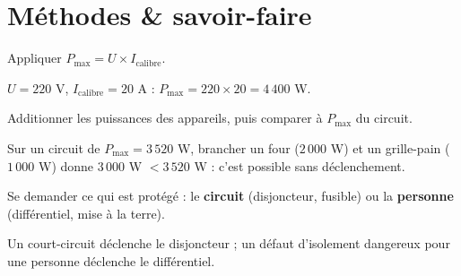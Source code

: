 \section{Méthodes \& savoir-faire}

Appliquer $P_{\max}=U\times I_{\text{calibre}}$.
\begin{exemple}
$U=220$ V, $I_{\text{calibre}}=20$ A : $P_{\max}=220\times20=4\,400$ W.
\end{exemple}

Additionner les puissances des appareils, puis comparer à $P_{\max}$ du circuit.
\begin{exemple}
Sur un circuit de $P_{\max}=3\,520$ W, brancher un four ($2\,000$ W) et un grille-pain
($1\,000$ W) donne $3\,000$ W $<3\,520$ W : c'est possible sans déclenchement.
\end{exemple}

Se demander ce qui est protégé : le \textbf{circuit} (disjoncteur, fusible) ou la
\textbf{personne} (différentiel, mise à la terre).
\begin{exemple}
Un court-circuit déclenche le disjoncteur ; un défaut d'isolement dangereux pour une
personne déclenche le différentiel.
\end{exemple}

